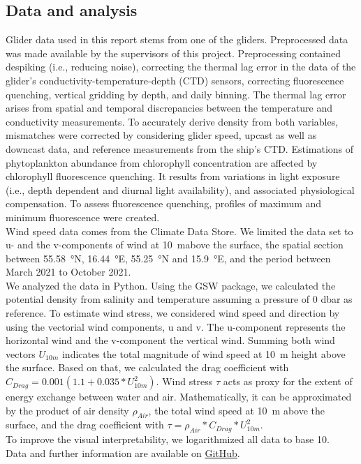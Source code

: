 \documentclass[../Main.tex]{subfiles}
\begin{document}
\subsection*{\crule[blue]{.2cm}{.2cm} Data and analysis}
Glider data used in this report stems from one of the gliders. 
Preprocessed data was made available by the supervisors of this project. 
Preprocessing contained despiking (i.e., reducing noise), correcting the thermal lag error in the data of the glider's conductivity-temperature-depth (CTD) sensors, correcting fluorescence quenching, vertical gridding by depth, and daily binning.
The thermal lag error arises from spatial and temporal discrepancies between the temperature and conductivity measurements\supercite{Garau2011}.
To accurately derive density from both variables, mismatches were corrected by considering glider speed, upcast as well as downcast data, and reference measurements from the ship's CTD. 
Estimations of phytoplankton abundance from chlorophyll concentration are affected by chlorophyll fluorescence quenching. 
It results from variations in light exposure (i.e., depth dependent and diurnal light availability), and associated physiological compensation\supercite{Thomalla2018}. 
To assess fluorescence quenching, profiles of maximum and minimum fluorescence were created.
\\
Wind speed data comes from the Climate Data Store\supercite{era}. 
We limited the data set to u- and the v-components of wind at \SI{10}{m}above the surface, the spatial section between \SI{55.58}{\degree}N, \SI{16.44}{\degree}E, \SI{55.25}{\degree}N and \SI{15.9}{\degree}E, and the period between March 2021 to October 2021.
\\
We analyzed the data in Python. Using the GSW package, we calculated the potential density from salinity and temperature assuming a pressure of 0 dbar as reference\supercite{gsw}. 
To estimate wind stress, we considered wind speed and direction by using the vectorial wind components, u and v.
The u-component represents the horizontal wind and the v-component the vertical wind. 
Summing both wind vectors $U_{10m}$ indicates the total magnitude of wind speed at \SI{10}{m} height above the surface. Based on that, we calculated the drag coefficient with $C_{Drag} = 0.001(1.1+0.035*U_{10m}^2)$. 
Wind stress $\tau$ acts as proxy for the extent of energy exchange between water and air.
Mathematically, it can be approximated by the product of air density $\rho_{Air}$, the total wind speed at \SI{10}{m} above the surface, and the drag coefficient with $\tau = \rho_{Air}*C_{Drag}*U_{10m}^2$\supercite{Mehrfar2018}.
\\
To improve the visual interpretability, we logarithmized all data to base 10.
\\
Data and further information are available on \href{https://github.com/joaldi2208/BloomDynamics}{GitHub}.
\end{document}
